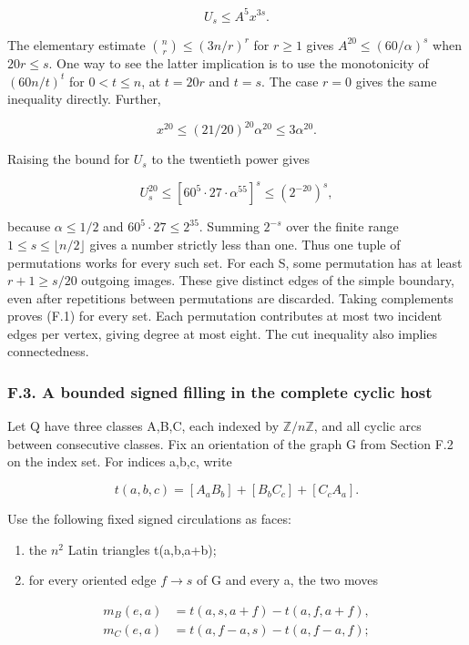 \documentclass[english,11pt,a4paper]{article}
\providecommand{\tightlist}{\setlength{\itemsep}{0pt}\setlength{\parskip}{0pt}}
\begin{document}
\[U_s\le A^5x^{3s}.\]

The elementary estimate \(\binom{n}{r}\le (3n/r)^{r}\) for \(r\ge 1\) gives \(A^{20}\le (60/\alpha)^{s}\) when \(20r\le s\). One way to see the latter implication is to use the monotonicity of \((60n/t)^{t}\) for \(0<t\le n\), at \(t=20r\) and \(t=s\). The case \(r=0\) gives the same inequality directly. Further,

\[x^{20}\le(21/20)^{20}\alpha^{20}\le3\alpha^{20}.\]

Raising the bound for \(U_{s}\) to the twentieth power gives

\[U_s^{20}\le[60^5\cdot27\cdot\alpha^{55}]^s\le(2^{-20})^s,\]

because \(\alpha\le 1/2\) and \(60^{5}\cdot 27\le 2^{35}\). Summing \(2^{-s}\) over the finite range \(1\le s\le \lfloor n/2\rfloor\) gives a number strictly less than one. Thus one tuple of permutations works for every such set. For each S, some permutation has at least \(r+1\ge s/20\) outgoing images. These give distinct edges of the simple boundary, even after repetitions between permutations are discarded. Taking complements proves (F.1) for every set. Each permutation contributes at most two incident edges per vertex, giving degree at most eight. The cut inequality also implies connectedness.

\subsubsection{F.3. A bounded signed filling in the complete cyclic host}\label{f.3.-a-bounded-signed-filling-in-the-complete-cyclic-host}

Let Q have three classes A,B,C, each indexed by \(\mathbb Z/n\mathbb Z\), and all cyclic arcs between consecutive classes. Fix an orientation of the graph G from Section F.2 on the index set. For indices a,b,c, write

\[t(a,b,c)=[A_aB_b]+[B_bC_c]+[C_cA_a].\]

Use the following fixed signed circulations as faces:

\begin{enumerate}
\def\labelenumi{\arabic{enumi}.}
\tightlist
\item
  the \(n^{2}\) Latin triangles t(a,b,a+b);
\item
  for every oriented edge \(f\to s\) of G and every a, the two moves
\end{enumerate}

\[\begin{aligned}m_B(e,a)&=t(a,s,a+f)-t(a,f,a+f),\\m_C(e,a)&=t(a,f-a,s)-t(a,f-a,f);\end{aligned}\]
\end{document}
